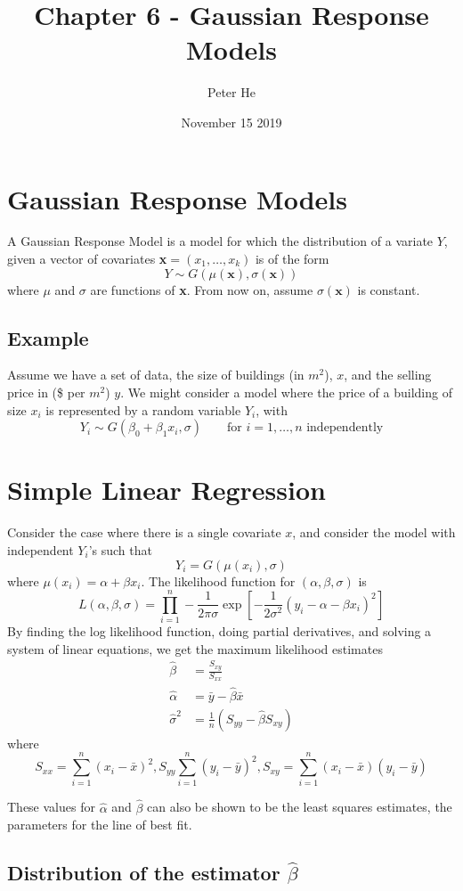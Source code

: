\documentclass[12pt]{article}
\title{Chapter 6 - Gaussian Response Models}
\author{Peter He}
\date{November 15 2019}
\begin{document}
\maketitle

\section{Gaussian Response Models}
A Gaussian Response Model is a model for which the distribution of a variate $Y$, given a vector of covariates \textbf{x}$=(x_1,\dots,x_k)$ is of the form \[Y\sim G(\mu(\textbf{x}),\sigma(\textbf{x}))\]
where $\mu$ and $\sigma$ are functions of \textbf{x}. From now on, assume $\sigma(\textbf{x})$ is constant.
\subsection{Example}
Assume we have a set of data, the size of buildings (in $m^2$), $x$, and the selling price in (\$ per $m^2$) $y$. We might consider a model where the price of a building of size $x_i$ is represented by a random variable $Y_i$, with \[Y_i\sim G(\beta_0+\beta_1x_i,\sigma)\qquad\text{for }i=1,\dots,n\text{ independently}\]
\section{Simple Linear Regression}
Consider the case where there is a single covariate $x$, and consider the model with independent $Y_i$'s such that \[Y_i=G(\mu(x_i),\sigma)\] where $\mu(x_i)=\alpha+\beta x_i$. The likelihood function for $(\alpha,\beta,\sigma)$ is \[L(\alpha,\beta,\sigma)=\prod_{i=1}^n-\frac{1}{2\pi\sigma}\exp\left[-\frac{1}{2\sigma^2}(y_i-\alpha-\beta x_i)^2\right]\]
By finding the log likelihood function, doing partial derivatives, and solving a system of linear equations, we get the maximum likelihood estimates
\begin{align*}
    \hat\beta&=\frac{S_{xy}}{S_{xx}}\\
    \hat\alpha&=\bar{y}-\hat{\beta}\bar{x}\\
    \hat{\sigma}^2&=\frac{1}{n}(S_{yy}-\hat{\beta}S_{xy})
\end{align*}
where \[S_{xx}=\sum_{i=1}^n(x_i-\bar{x})^2,S_{yy}\sum_{i=1}^n(y_i-\bar{y})^2,S_{xy}=\sum_{i=1}^n(x_i-\bar{x})(y_i-\bar{y})\]

These values for $\hat \alpha$ and $\hat \beta$ can also be shown to be the least squares estimates, the parameters for the line of best fit.

\subsection{Distribution of the estimator $\hat\beta$}
\end{document}
